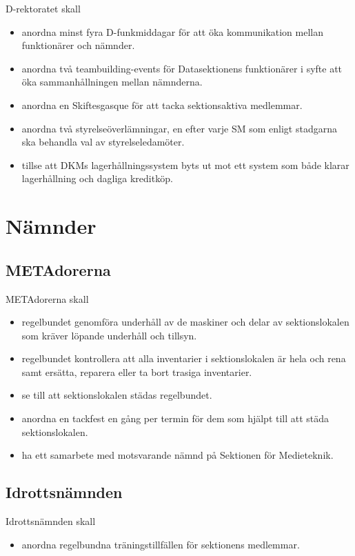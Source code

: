 \documentclass{dgovdoc}
\begin{document}
D-rektoratet skall

\begin{itemize}
\item anordna minst fyra D-funkmiddagar för att öka kommunikation mellan
  funktionärer och nämnder.
\item anordna två teambuilding-events för Datasektionens funktionärer i syfte
  att öka sammanhållningen mellan nämnderna.
\item anordna en Skiftesgasque för att tacka sektionsaktiva medlemmar.
\item anordna två styrelseöverlämningar, en efter varje SM som enligt stadgarna
  ska behandla val av styrelseledamöter.
\item tillse att DKMs lagerhållningssystem byts ut mot ett system som både
  klarar lagerhållning och dagliga kreditköp.
\end{itemize}

\section{Nämnder}

\subsection{METAdorerna}

METAdorerna skall

\begin{itemize}
\item regelbundet genomföra underhåll av de maskiner och delar av
  sektionslokalen som kräver löpande underhåll och tillsyn.
\item regelbundet kontrollera att alla inventarier i sektionslokalen är hela
  och rena samt ersätta, reparera eller ta bort trasiga inventarier.
\item se till att sektionslokalen städas regelbundet.
\item anordna en tackfest en gång per termin för dem som hjälpt till att städa
  sektionslokalen.
\item ha ett samarbete med motsvarande nämnd på Sektionen för Medieteknik.
\end{itemize}

\subsection{Idrottsnämnden}

Idrottsnämnden skall

\begin{itemize}
\item anordna regelbundna träningstillfällen för sektionens medlemmar.
\end{itemize}
\end{document}
